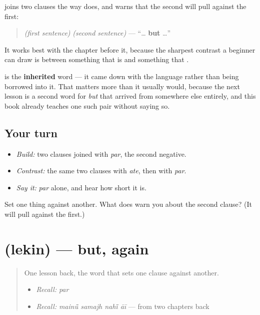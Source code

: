 \begin{cousinweb}
\textbf{} joins two clauses the way \textbf{} does, and warns that the second will pull against the first:

\begin{quote}
\emph{(first sentence)} \textbf{} \emph{(second sentence)} — \textquotedblleft{}… \textbf{but} …\textquotedblright{}
\end{quote}

It works best with the chapter before it, because the sharpest contrast a beginner can draw is between something that is and something that \textbf{}.

\textbf{} is the \textbf{inherited} word — it came down with the language rather than being borrowed into it. That matters more than it usually would, because the next lesson is a second word for \emph{but} that arrived from somewhere else entirely, and this book already teaches one such pair without saying so.
\end{cousinweb}

\subsection*{Your turn}
\begin{itemize}
\raggedright
  \item \emph{Build:} two clauses joined with \emph{par}, the second negative.
  \item \emph{Contrast:} the same two clauses with \emph{ate}, then with \emph{par}.
  \item \emph{Say it:} \emph{par} alone, and hear how short it is.
\end{itemize}

\begin{tcolorbox}[breakable,colback=teal!4,colframe=teal!35!black,title={Before you move on}]
Set one thing against another. What does \textbf{} warn you about the second clause? (It will pull against the first.)
\end{tcolorbox}
\section[\texorpdfstring{\pa{ਲੇਕਿਨ} (lekin)}{ਲੇਕਿਨ (lekin)}]{ (lekin) — but, again}

\label{lesson:PA-C39-lekin}



\begin{quote}
One lesson back, the word that sets one clause against another.

\begin{itemize}
\raggedright
  \item \emph{Recall:} \emph{par}
  \item \emph{Recall:} \emph{mainū̃ samajh nahī̃ āī} — from two chapters back
\end{itemize}
\end{quote}

